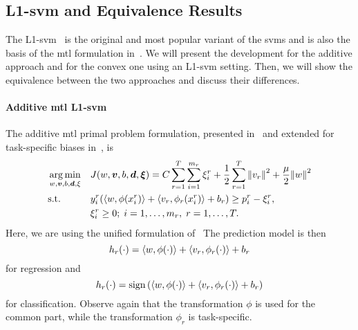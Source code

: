 \subsection{L1-\acrshort{svm} and Equivalence Results}\label{subsec:cvx_l1-svm}
The L1-\acrshort{svm}~\citep{Vapnik00} is the original and most popular variant of the \acrshort{svm}s and is also the basis of the \acrshort{mtl} formulation in~\cite{EvgeniouP04}.
We will present the development for the {additive} approach and for the {convex} one using an L1-\acrshort{svm} setting. Then, we will show the equivalence between the two approaches and discuss their differences.

\paragraph*{{Additive} \acrshort{mtl} L1-\acrshort{svm}\\}
The {additive} \acrshort{mtl} primal problem formulation, presented in~\cite{EvgeniouP04} 
and extended for task-specific biases in~\cite{CaiC12}, is
\begin{equation}\label{eq:svmmtl_primal_add}
    \begin{aligned}
    & \argmin_{w, \fv{v}, b, \fv{d}, \xi}
    & & {J({w}, \fv{v}, b, \fv{d}, \fv{\xi}) = C \sum_{r= 1}^T \sum_{i=1}^{m_r} {\xi_{i}^r} + \frac{1}{2} \sum_{r= 1}^T{\norm{{v}_r}^2} + \frac{\mu}{2} {\norm{{w}}}^2} \\
    & \text{s.t.}
    & & y_{i}^r (\dotp{w}{\phi(x_{i}^r)} + \dotp{v_r}{\phi_r(x_{i}^r)} + b_r) \geq p_{i}^r - \xi_{i}^r ,  \\
    & & & \xi_{i}^r \geq 0; \;  i=1 , \dotsc , m_r, \;  r= 1,\dotsc, T  . \\
    \end{aligned}
\end{equation}
Here, we are using the unified formulation of~
The prediction model is then 
\begin{equation}
    \nonumber
    h_r(\cdot) = \left\langle w, \phi(\cdot) \right\rangle + \left\langle {v}_r, \phi_r(\cdot) \right\rangle + b_r
\end{equation}
for regression and 
\begin{equation}
    \nonumber
    h_r(\cdot) = \operatorname{sign}{ \left(\left\langle w, \phi(\cdot) \right\rangle + \left\langle {v}_r, \phi_r(\cdot) \right\rangle + b_r \right)}
\end{equation}
for classification.
Observe again that the transformation $\phi$ is used for the common part, while the transformation $\phi_r$ is task-specific.

